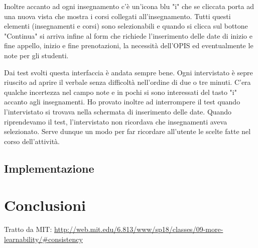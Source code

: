 \documentclass[Lau, oneside]{sapthesis}%
\begin{document}
Inoltre accanto ad ogni insegnamento c'è un'icona blu "i" che se cliccata porta ad una nuova vista che mostra i corsi collegati all'insegnamento. Tutti questi elementi (insegnamenti e corsi) sono selezionabili e quando si clicca sul bottone "Continua" si arriva infine al form che richiede l'inserimento delle date di inizio e fine appello, inizio e fine prenotazioni, la necessità dell'OPIS ed eventualmente le note per gli studenti.

Dai test svolti questa interfaccia è andata sempre bene. Ogni intervistato è sepre riuscito ad aprire il verbale senza difficoltà nell'ordine di due o tre minuti. C'era qualche incertezza nel campo note e in pochi si sono interessati del tasto "i" accanto agli insegnamenti. Ho provato inoltre ad interrompere il test quando l'intervistato si trovava nella schermata di inserimento delle date. Quando riprendevamo il test, l'intervistato non ricordava che insegnamenti aveva selezionato. Serve dunque un modo per far ricordare all'utente le scelte fatte nel corso dell'attività.

%
%
%
%


\section{Implementazione}
\label{sec:dev}


\chapter{Conclusioni}
\label{ch:4}

\backmatter
{}
\begin{thebibliography}{17}

Tratto da MIT:
\url{http://web.mit.edu/6.813/www/sp18/classes/09-more-learnability/#consistency}

\end{thebibliography}
\end{document}
